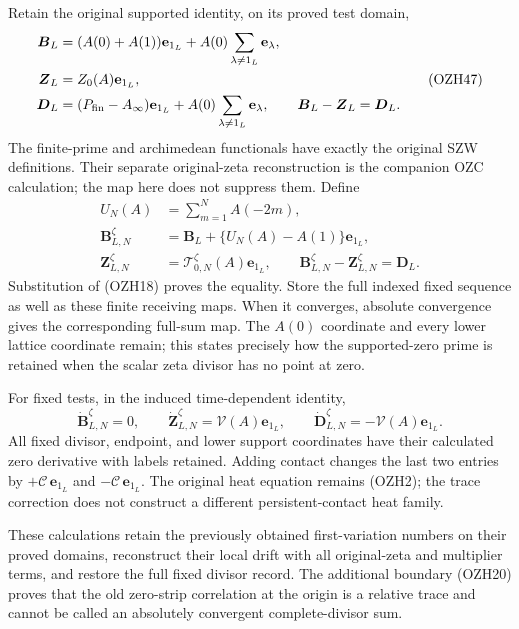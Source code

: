 \documentclass[
  10pt,
  a4paper,
]{article}
\begin{document}
Retain the original supported identity, on its proved test domain, \[
\begin{aligned}
\boldsymbol B_L&=(A(0)+A(1))\mathbf e_{1_L}
+A(0)\sum_{\lambda\ne1_L}\mathbf e_\lambda,\\
\boldsymbol Z_L&=Z_0(A)\mathbf e_{1_L},\\
\boldsymbol D_L&=(P_{\rm fin}-A_\infty)\mathbf e_{1_L}
+A(0)\sum_{\lambda\ne1_L}\mathbf e_\lambda,\qquad
\boldsymbol B_L-\boldsymbol Z_L=\boldsymbol D_L.
\end{aligned}\tag{OZH47}
\] The finite-prime and archimedean functionals have exactly the
original SZW definitions. Their separate original-zeta reconstruction is
the companion OZC calculation; the map here does not suppress them.
Define \[
\begin{aligned}
U_N(A)&=\sum_{m=1}^N A(-2m),\\
\boldsymbol B_{L,N}^\zeta&=\boldsymbol B_L+
\{U_N(A)-A(1)\}\mathbf e_{1_L},\\
\boldsymbol Z_{L,N}^\zeta&=\mathcal T_{0,N}^\zeta(A)\mathbf e_{1_L},\qquad
\boldsymbol B_{L,N}^\zeta-\boldsymbol Z_{L,N}^\zeta
=\boldsymbol D_L.
\end{aligned}\tag{OZH48}
\] Substitution of (OZH18) proves the equality. Store the full indexed
fixed sequence as well as these finite receiving maps. When it
converges, absolute convergence gives the corresponding full-sum map.
The \(A(0)\) coordinate and every lower lattice coordinate remain; this
states precisely how the supported-zero prime is retained when the
scalar zeta divisor has no point at zero.

For fixed tests, in the induced time-dependent identity, \[
\dot{\boldsymbol B}_{L,N}^\zeta=0,\qquad
\dot{\boldsymbol Z}_{L,N}^\zeta=\mathcal V(A)\mathbf e_{1_L},\qquad
\dot{\boldsymbol D}_{L,N}^\zeta=-\mathcal V(A)\mathbf e_{1_L}.
\tag{OZH49}
\] All fixed divisor, endpoint, and lower support coordinates have their
calculated zero derivative with labels retained. Adding contact changes
the last two entries by \(+\mathcal C\,\mathbf e_{1_L}\) and
\(-\mathcal C\,\mathbf e_{1_L}\). The original heat equation remains
(OZH2); the trace correction does not construct a different
persistent-contact heat family.

These calculations retain the previously obtained first-variation
numbers on their proved domains, reconstruct their local drift with all
original-zeta and multiplier terms, and restore the full fixed divisor
record. The additional boundary (OZH20) proves that the old zero-strip
correlation at the origin is a relative trace and cannot be called an
absolutely convergent complete-divisor sum.
\end{document}
